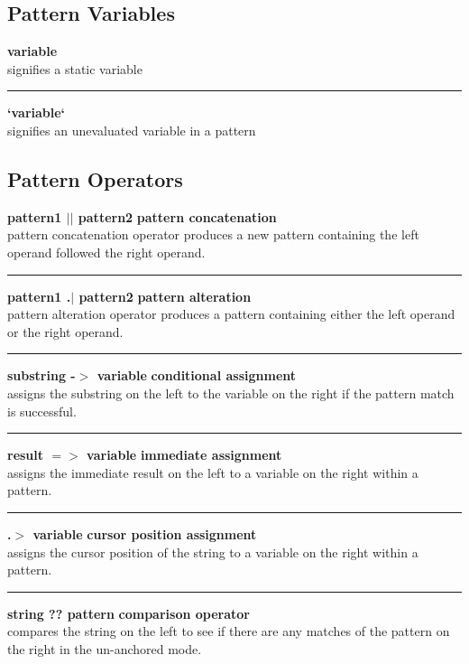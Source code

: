 \documentclass{article}
\begin{document}
\subsection{Pattern Variables}
\textbf{variable} \\
signifies a static variable\\
\noindent\rule{12cm}{0.4pt}
 
\noindent\textbf{`variable`} \\
signifies an unevaluated variable in a pattern\\

\subsection{Pattern Operators}
\noindent\textbf{pattern1 $\vert\vert$	pattern2} \hfill \textbf{pattern concatenation}\\
pattern concatenation operator produces a new pattern containing the left operand followed the right operand.\\
\noindent\rule{12cm}{0.4pt}

\noindent\textbf{pattern1 .$\vert$ pattern2} \hfill \textbf{pattern alteration}\\
pattern alteration operator produces a pattern containing either the left operand or the right operand.\\
\noindent\rule{12cm}{0.1pt}

\noindent\textbf{substring -$>$ variable} \hfill\textbf{conditional assignment}\\
assigns the substring on the left to the variable on the right if the pattern match is successful.\\
\noindent\rule{12cm}{0.1pt}

\noindent\textbf{result $=>$ variable} \hfill\textbf{immediate assignment}\\
assigns the immediate result on the left to a variable on the right within a pattern.\\
\noindent\rule{12cm}{0.1pt}

\noindent\textbf{.$>$ variable} \hfill\textbf{cursor position assignment}\\
assigns the cursor position of the string to a variable on the right within a pattern.\\
\noindent\rule{12cm}{0.1pt}

\noindent\textbf{string ?? pattern} \hfill\textbf{comparison operator}\\
compares the string on the left to see if there are any matches of the pattern on the right in the un-anchored mode.\\
\end{document}
